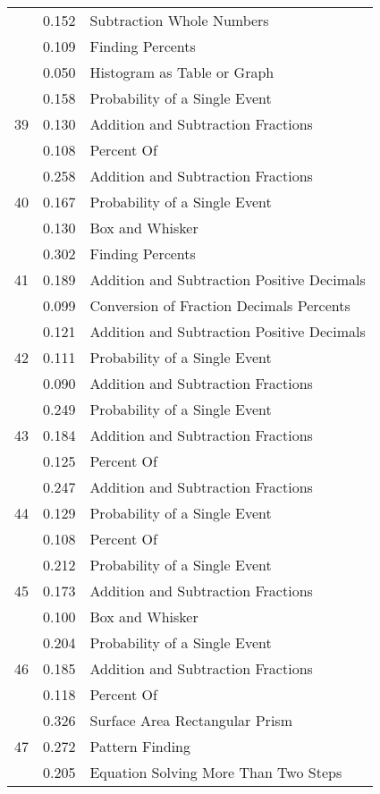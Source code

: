 \begin{longtable}[c]{|c|c|l|}
 & 0.152 & Subtraction Whole Numbers \\
 & 0.109 & Finding Percents \\
 & 0.050 & Histogram as Table or Graph \\
\hline
\multirow{3}{*}{39} & 0.158 & Probability of a Single Event \\
 & 0.130 & Addition and Subtraction Fractions \\
 & 0.108 & Percent Of \\
\hline
\multirow{3}{*}{40} & 0.258 & Addition and Subtraction Fractions \\
 & 0.167 & Probability of a Single Event \\
 & 0.130 & Box and Whisker \\
\hline
\multirow{3}{*}{41} & 0.302 & Finding Percents \\
 & 0.189 & Addition and Subtraction Positive Decimals \\
 & 0.099 & Conversion of Fraction Decimals Percents \\
\hline
\multirow{3}{*}{42} & 0.121 & Addition and Subtraction Positive Decimals \\
 & 0.111 & Probability of a Single Event \\
 & 0.090 & Addition and Subtraction Fractions \\
\hline
\multirow{3}{*}{43} & 0.249 & Probability of a Single Event \\
 & 0.184 & Addition and Subtraction Fractions \\
 & 0.125 & Percent Of \\
\hline
\multirow{3}{*}{44} & 0.247 & Addition and Subtraction Fractions \\
 & 0.129 & Probability of a Single Event \\
 & 0.108 & Percent Of \\
\hline
\multirow{3}{*}{45} & 0.212 & Probability of a Single Event \\
 & 0.173 & Addition and Subtraction Fractions \\
 & 0.100 & Box and Whisker \\
\hline
\multirow{3}{*}{46} & 0.204 & Probability of a Single Event \\
 & 0.185 & Addition and Subtraction Fractions \\
 & 0.118 & Percent Of \\
\hline
\multirow{4}{*}{47} & 0.326 & Surface Area Rectangular Prism \\
 & 0.272 & Pattern Finding  \\
 & 0.205 & Equation Solving More Than Two Steps \\

\end{longtable}
